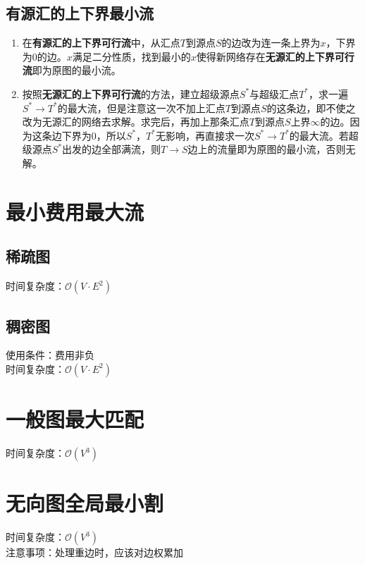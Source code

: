 \documentclass[openany, a4paper, 10pt]{book}
\begin{document}
\begin{spacing}{1.1}
		\subsection{有源汇的上下界最小流}
			\begin{enumerate}
				\item 在\textbf{有源汇的上下界可行流}中，从汇点$T$到源点$S$的边改为连一条上界为$x$，下界为$0$的边。$x$满足二分性质，找到最小的$x$使得新网络存在\textbf{无源汇的上下界可行流}即为原图的最小流。
				\item 按照\textbf{无源汇的上下界可行流}的方法，建立超级源点$S^*$与超级汇点$T^*$，求一遍$S^* \rightarrow T^*$的最大流，但是注意这一次不加上汇点$T$到源点$S$的这条边，即不使之改为无源汇的网络去求解。求完后，再加上那条汇点$T$到源点$S$上界$\infty$的边。因为这条边下界为$0$，所以$S^*$，$T^*$无影响，再直接求一次$S^* \rightarrow T^*$的最大流。若超级源点$S^*$出发的边全部满流，则$T \rightarrow S$边上的流量即为原图的最小流，否则无解。
			\end{enumerate}
		\section{最小费用最大流}
		\subsection{稀疏图}
			时间复杂度：$\mathcal{O}(V \cdot E^2)$
			
		\subsection{稠密图}
			使用条件：费用非负\\
			\indent 时间复杂度：$\mathcal{O}(V \cdot E^2)$
			
		\section{一般图最大匹配}
			时间复杂度：$\mathcal{O}(V^3)$
			
		\section{无向图全局最小割}
			时间复杂度：$\mathcal{O}(V^3)$\\
			\indent 注意事项：处理重边时，应该对边权累加
			

\end{spacing}
\end{document}

